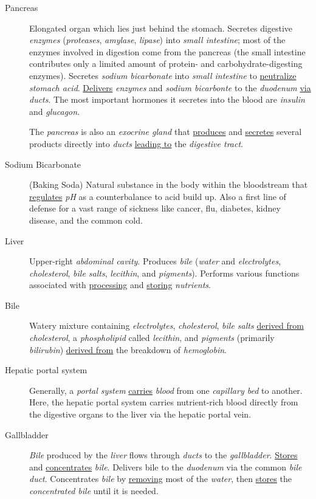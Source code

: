 \documentclass[11pt]{article}
\begin{document}
\begin{description}
\item[{Pancreas}] Elongated organ which lies just behind the stomach. Secretes
digestive \emph{enzymes} (\emph{proteases}, \emph{amylase}, \emph{lipase}) into \emph{small intestine}; most
of the enzymes involved in digestion come from the pancreas (the small
intestine contributes only a limited amount of protein- and
carbohydrate-digesting enzymes). Secretes \emph{sodium bicarbonate} into \emph{small
intestine} to \uline{neutralize} \emph{stomach acid}. \uline{Delivers} \emph{enzymes} and \emph{sodium
bicarbonte} to the \emph{duodenum} \uline{via} \emph{ducts}. The most important hormones it
secretes into the blood are \emph{insulin} and \emph{glucagon}.

The \emph{pancreas} is also an \emph{exocrine gland} that \uline{produces} and \uline{secretes} several
products directly into \emph{ducts} \uline{leading to} the \emph{digestive tract}.
\item[{Sodium Bicarbonate}] (Baking Soda) Natural substance in the body within the
bloodstream that \uline{regulates} \emph{pH} as a counterbalance to acid build up. Also a
first line of defense for a vast range of sickness like cancer, flu,
diabetes, kidney disease, and the common cold.
\item[{Liver}] Upper-right \emph{abdominal cavity}. Produces \emph{bile} (\emph{water} and \emph{electrolytes},
\emph{cholesterol}, \emph{bile salts}, \emph{lecithin}, and \emph{pigments}). Performs various
functions associated with \uline{processing} and \uline{storing} \emph{nutrients}.
\item[{Bile}] Watery mixture containing \emph{electrolytes}, \emph{cholesterol}, \emph{bile salts}
\uline{derived from} \emph{cholesterol}, a \emph{phospholipid} called \emph{lecithin}, and \emph{pigments}
(primarily \emph{bilirubin}) \uline{derived from} the breakdown of \emph{hemoglobin}.
\item[{Hepatic portal system}] Generally, a \emph{portal system} \uline{carries} \emph{blood} from one
\emph{capillary bed} to another. Here, the hepatic portal system carries
nutrient-rich blood directly from the digestive organs to the liver via the
hepatic portal vein.
\item[{Gallbladder}] \emph{Bile} produced by the \emph{liver} flows through \emph{ducts} to the
\emph{gallbladder}. \uline{Stores} and \uline{concentrates} \emph{bile}. Delivers bile to the \emph{duodenum}
via the common \emph{bile duct}. Concentrates \emph{bile} by \uline{removing} most of the \emph{water},
then \uline{stores} the \emph{concentrated bile} until it is needed.
\end{description}
\end{document}

